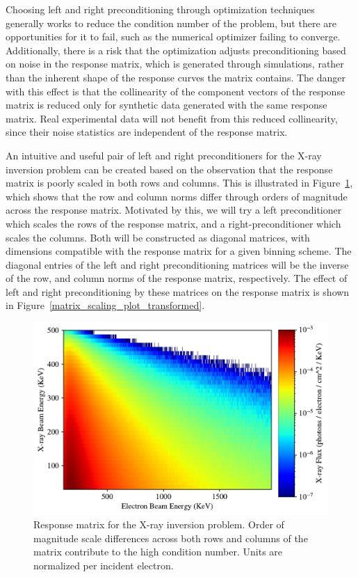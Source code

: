 Choosing left and right preconditioning through optimization techniques generally works to reduce the condition number of the problem, but there are opportunities for it to fail, such as the numerical optimizer failing to converge. Additionally, there is a risk that the optimization adjusts preconditioning based on noise in the response matrix, which is generated through simulations, rather than the inherent shape of the response curves the matrix contains. The danger with this effect is that the collinearity of the component vectors of the response matrix is reduced only for synthetic data generated with the same response matrix. Real experimental data will not benefit from this reduced collinearity, since their noise statistics are independent of the response matrix. 

An intuitive and useful pair of left and right preconditioners for the X-ray inversion problem can be created based on the observation that the response matrix is poorly scaled in both rows and columns. This is illustrated in Figure~\ref{matrix_scaling_plot}, which shows that the row and column norms differ through orders of magnitude across the response matrix. Motivated by this, we will try a left preconditioner which scales the rows of the response matrix, and a right-preconditioner which scales the columns. Both will be constructed as diagonal matrices, with dimensions compatible with the response matrix for a given binning scheme. The diagonal entries of the left and right preconditioning matrices will be the inverse of the row, and column norms of the response matrix, respectively. The effect of left and right preconditioning by these matrices on the response matrix is shown in Figure~\ref{matrix_scaling_plot_transformed}.

\begin{figure}[p]
    \centering
    \includegraphics[width=\textwidth]{figures/chapter_4/matrix_scaling_plot/matrix_scaling_plot_vanilla.pdf}
    \caption{Response matrix for the X-ray inversion problem. Order of magnitude scale differences across both rows and columns of the matrix contribute to the high condition number. Units are normalized per incident electron.}
    \label{matrix_scaling_plot}
\end{figure}

